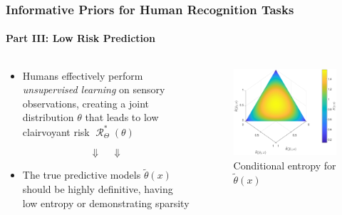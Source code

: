 \documentclass[aspectratio=169,usenames,dvipsnames]{beamer}
\DeclareMathOperator{\Rcal}{\mathcal{R}}
\begin{document}
\begin{frame}
\frametitle{Informative Priors for Human Recognition Tasks}
\framesubtitle{Part III: Low Risk Prediction}

\begin{columns}[c]

\begin{column}{.6\linewidth}

\begin{itemize}
\item Humans effectively perform \emph{unsupervised learning} on sensory observations, creating a joint distribution $\theta$ that leads to low clairvoyant risk $\Rcal_{\Theta}^*(\theta)$

\vspace{-1em}
\Large
\begin{equation*} 
\Downarrow \quad \Downarrow
\end{equation*}
\normalsize

\vspace{0.5em}
\item The true predictive models $\tilde{\theta}(x)$ should be highly definitive, having \alert{low entropy} or demonstrating \alert{sparsity}

\end{itemize}



\end{column}

\begin{column}{.4\linewidth}

\begin{figure}
\centering
\includegraphics[width=1\linewidth]{theta_tilde_entropy.pdf}
\caption{Conditional entropy for $\tilde{\theta}(x)$}
\label{fig:theta_tilde_entropy}
\end{figure}

\end{column}

\end{columns}

\end{frame}
\end{document}
